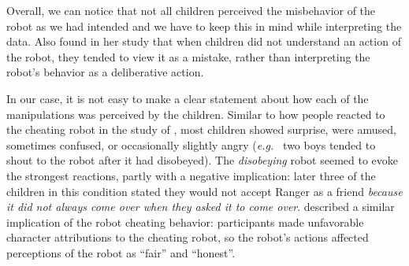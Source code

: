 \documentclass{sig-alternate}
\newcommand{\eg}{{\textit{e.g.~}}}
\begin{document}

Overall, we can notice that not all children perceived the misbehavior of the
robot as we had intended and we have to keep this in mind while interpreting the
data. Also \cite{leite_long-term_2013} found in her study that when children did
not understand an action of the robot, they tended to view it as a mistake,
rather than interpreting the robot's behavior as a deliberative action.


In our case, it is not easy to make a clear statement about how each of the
manipulations was perceived by the children.  Similar to how people reacted to
the cheating robot in the study of \cite{short_no_2010}, most children showed
surprise, were amused, sometimes confused, or occasionally slightly angry (\eg
two boys tended to shout to the robot after it had disobeyed). The
\textit{disobeying} robot seemed to evoke the strongest reactions, partly with a
negative implication: later three of the children in this condition stated they
would not accept Ranger as a friend \textit{because it did not always come over
when they asked it to come over}. \cite{short_no_2010} described a similar
implication of the robot cheating behavior: participants made unfavorable
character attributions to the cheating robot, so the robot's actions affected
perceptions of the robot as ``fair'' and ``honest''.



\end{document}

